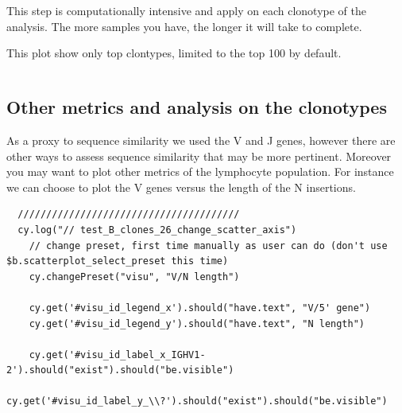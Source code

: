

\begin{verbatim}
\end{verbatim}

This step is computationally intensive and apply on each clonotype of the analysis.
The more samples you have, the longer it will take to complete.


This plot show only top clontypes, limited to the top 100 by default.



\begin{verbatim}
\end{verbatim}



\subsection{Other metrics and analysis on the clonotypes}

As a proxy to sequence similarity we used the V and J genes, however there are
other ways to assess sequence similarity that may be more pertinent.
Moreover you may want to plot other metrics of the lymphocyte population.
%
For instance we can choose to plot the V genes versus the length of the N
insertions.
\begin{verbatim}
  ///////////////////////////////////////
  cy.log("// test_B_clones_26_change_scatter_axis")
    // change preset, first time manually as user can do (don't use $b.scatterplot_select_preset this time)
    cy.changePreset("visu", "V/N length")

    cy.get('#visu_id_legend_x').should("have.text", "V/5' gene")
    cy.get('#visu_id_legend_y').should("have.text", "N length")

    cy.get('#visu_id_label_x_IGHV1-2').should("exist").should("be.visible")
    cy.get('#visu_id_label_y_\\?').should("exist").should("be.visible")


\end{verbatim}

